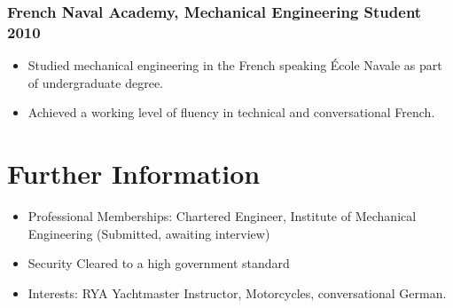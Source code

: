 \documentclass[a4paper, oneside, final, 11pt]{scrartcl} %
\begin{document}
\smallskip 

\subsubsection*{French Naval Academy, Mechanical Engineering Student \hfill 2010} 
\begin{itemize}
\item Studied mechanical engineering in the French speaking École Navale as part of undergraduate degree. 

\item Achieved a working level of fluency in technical and conversational French. 
\end{itemize}
\medskip


\section{Further Information}
\begin{itemize}	
\item Professional Memberships: Chartered Engineer, Institute of Mechanical Engineering (Submitted, awaiting interview)
\item Security Cleared to a high government standard
\item Interests: RYA Yachtmaster Instructor, Motorcycles, conversational German. 
\end{itemize}






\end{document}
